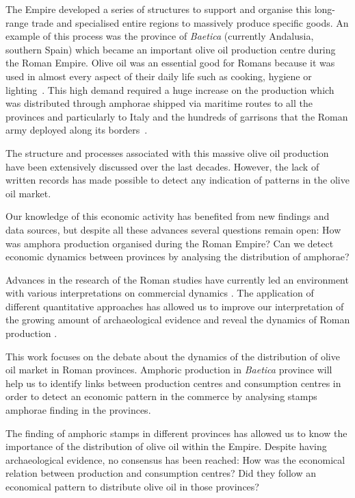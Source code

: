 \documentclass[review]{elsarticle}
\newcommand{\memo}[2]{\textcolor{#1}{#2}}
\newcommand{\xavi}[1]{\memo{magenta}{XRC: #1\\}}
\begin{document}
The Empire developed a series of structures to support and organise this long-range trade and specialised entire regions to massively produce specific goods. An example of this process was the province of \textit{Baetica} (currently Andalusia, southern Spain) which became an important olive oil production centre during the Roman Empire. Olive oil was an essential good for Romans because it was used in almost every aspect of their daily life such as cooking, hygiene or lighting~\citep{mattingly_d.j._oil_1988}. This high demand required a huge increase on the production which was distributed through amphorae shipped via maritime routes to all the provinces and particularly to Italy and the hundreds of garrisons that the Roman army deployed along its borders~\citep{blazquez_exportacion_1980}. 

The structure and processes associated with this massive olive oil production have been extensively discussed over the last decades\citep{rodriguez_economioleicola_1977, Chic_hispania_1997,millet_anforas_1998}. 
However, the lack of written records has made possible to detect any indication of patterns in the olive oil market.

Our knowledge of this economic activity has benefited from new findings and data sources, but despite all these advances several questions remain open: How was amphora production organised during the Roman Empire? Can we detect economic dynamics between provinces by analysing the distribution of amphorae?


Advances in the research of the Roman studies have currently led an environment with various interpretations on commercial dynamics \citep{duncan1982economy,
temin_economy_2006,
quantifyingwilson2009}.
The application of different quantitative approaches has allowed us to improve our interpretation of the growing amount of archaeological evidence and reveal the dynamics of Roman production
\citep{brughmans_roman_2016,
orengo_seeds_2016,bayesian_2018,
coto-sarmiento_identifying_2018,
rubio-campillo_ecology_2018}.

This work focuses on the debate about the dynamics of the distribution of olive oil market in Roman provinces. Amphoric production in \textit{Baetica} province will help us to identify links between production centres and consumption centres in order to detect an economic pattern in the commerce by analysing stamps amphorae finding in the provinces. 

The finding of amphoric stamps in different provinces has allowed us to know the importance of the distribution of olive oil within the Empire. Despite having archaeological evidence, no consensus has been reached: How was the economical relation between production and consumption centres? Did they follow an economical pattern to distribute olive oil in those provinces?
  
\end{document}
